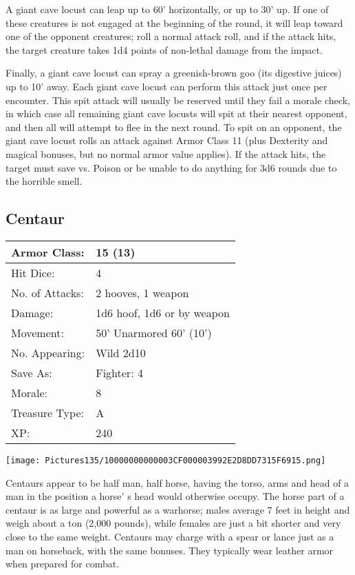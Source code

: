 \documentclass[a4paper,twoside,openany,10pt]{book}
\begin{document}
\begin{multicols}{2}
A giant cave locust can leap up to 60' horizontally, or up to 30' up. If one of these creatures is not engaged at the beginning of the round, it will leap toward one of the opponent creatures; roll a normal attack roll, and if the attack hits, the target creature takes 1d4 points of non-lethal damage from the impact.

Finally, a giant cave locust can spray a greenish-brown goo (its digestive juices) up to 10' away. Each giant cave locust can perform this attack just once per encounter. This spit attack will usually be reserved until they fail a morale check, in which case all remaining giant cave locusts will spit at their nearest opponent, and then all will attempt to flee in the next round. To spit on an opponent, the giant cave locust rolls an attack against Armor Class 11 (plus Dexterity and magical bonuses, but no normal armor value applies). If the attack hits, the target must save vs. Poison or be unable to do anything for 3d6 rounds due to the horrible smell.

\subsection*{Centaur}\label{centaur}

\begin{tabularx}{0.48\textwidth}{@{}lX@{}}
Armor Class: & 15 (13) \\\hline
Hit Dice: & 4 \\\hline
No. of Attacks: & 2 hooves, 1 weapon \\\hline
Damage: & 1d6 hoof, 1d6 or by weapon \\\hline
Movement: & 50' Unarmored 60'
(10') \\\hline
No. Appearing: & Wild 2d10 \\\hline
Save As: & Fighter: 4 \\\hline
Morale: & 8 \\\hline
Treasure Type: & A \\\hline
XP: & 240 \\\hline
\end{tabularx}\medskip


\begin{center}
	\texttt{[image: Pictures135/10000000000003CF000003992E2D8DD7315F6915.png]}
\end{center}\medskip

Centaurs appear to be half man, half horse, having the torso, arms and head of a man in the position a horse' s head would otherwise occupy. The horse part of a centaur is as large and powerful as a warhorse; males average 7 feet in height and weigh about a ton (2,000 pounds), while females are just a bit shorter and very close to the same weight. Centaurs may charge with a spear or lance just as a man on horseback, with the same bonuses. They typically wear leather armor when prepared for combat.


\end{multicols}
\end{document}
